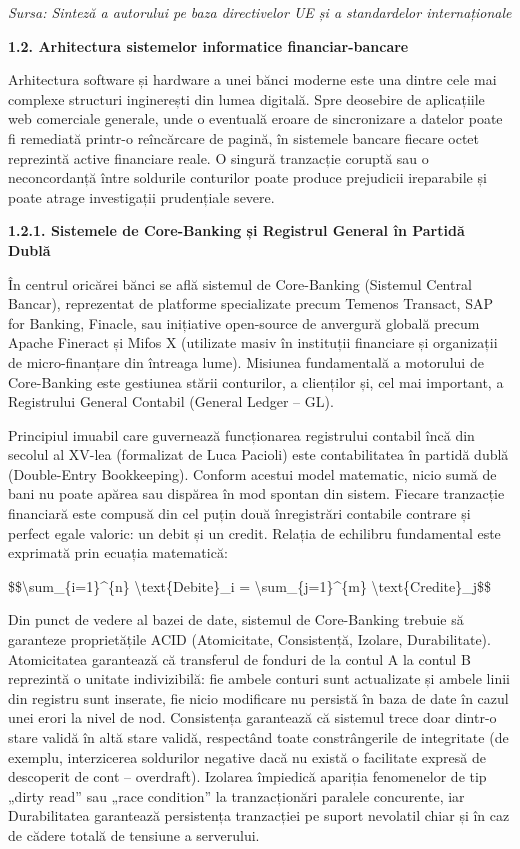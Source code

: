 \documentclass[
]{article}
\begin{document}
\emph{Sursa: Sinteză a autorului pe baza directivelor UE și a
standardelor internaționale}

\textbf{1.2. Arhitectura sistemelor informatice financiar-bancare}

Arhitectura software și hardware a unei bănci moderne este una dintre
cele mai complexe structuri inginerești din lumea digitală. Spre
deosebire de aplicațiile web comerciale generale, unde o eventuală
eroare de sincronizare a datelor poate fi remediată printr-o reîncărcare
de pagină, în sistemele bancare fiecare octet reprezintă active
financiare reale. O singură tranzacție coruptă sau o neconcordanță între
soldurile conturilor poate produce prejudicii ireparabile și poate
atrage investigații prudențiale severe.

\textbf{1.2.1. Sistemele de Core-Banking și Registrul General în Partidă
Dublă}

În centrul oricărei bănci se află sistemul de Core-Banking (Sistemul
Central Bancar), reprezentat de platforme specializate precum Temenos
Transact, SAP for Banking, Finacle, sau inițiative open-source de
anvergură globală precum Apache Fineract și Mifos X (utilizate masiv în
instituții financiare și organizații de micro-finanțare din întreaga
lume). Misiunea fundamentală a motorului de Core-Banking este gestiunea
stării conturilor, a clienților și, cel mai important, a Registrului
General Contabil (General Ledger -- GL).

Principiul imuabil care guvernează funcționarea registrului contabil
încă din secolul al XV-lea (formalizat de Luca Pacioli) este
contabilitatea în partidă dublă (Double-Entry Bookkeeping). Conform
acestui model matematic, nicio sumă de bani nu poate apărea sau dispărea
în mod spontan din sistem. Fiecare tranzacție financiară este compusă
din cel puțin două înregistrări contabile contrare și perfect egale
valoric: un debit și un credit. Relația de echilibru fundamental este
exprimată prin ecuația matematică:

\$\$\textbackslash sum\_\{i=1\}\^{}\{n\}
\textbackslash text\{Debite\}\_i = \textbackslash sum\_\{j=1\}\^{}\{m\}
\textbackslash text\{Credite\}\_j\$\$

Din punct de vedere al bazei de date, sistemul de Core-Banking trebuie
să garanteze proprietățile ACID (Atomicitate, Consistență, Izolare,
Durabilitate). Atomicitatea garantează că transferul de fonduri de la
contul A la contul B reprezintă o unitate indivizibilă: fie ambele
conturi sunt actualizate și ambele linii din registru sunt inserate, fie
nicio modificare nu persistă în baza de date în cazul unei erori la
nivel de nod. Consistența garantează că sistemul trece doar dintr-o
stare validă în altă stare validă, respectând toate constrângerile de
integritate (de exemplu, interzicerea soldurilor negative dacă nu există
o facilitate expresă de descoperit de cont -- overdraft). Izolarea
împiedică apariția fenomenelor de tip „dirty read'' sau „race
condition'' la tranzacționări paralele concurente, iar Durabilitatea
garantează persistența tranzacției pe suport nevolatil chiar și în caz
de cădere totală de tensiune a serverului.
\end{document}
